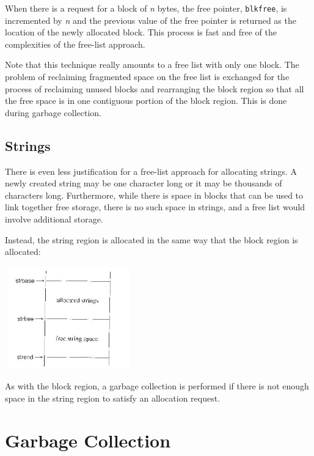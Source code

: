 When there is a request for a block of \textit{n} bytes, the free
pointer, \texttt{blkfree}, is incremented by \textit{n} and the
previous value of the free pointer is returned as the location of the
newly allocated block. This process is fast and free of the
complexities of the free-list approach.


Note that this technique really amounts to a free list with only one
block. The problem of reclaiming fragmented space on the free list is
exchanged for the process of reclaiming unused blocks and rearranging
the block region so that all the free space is in one contiguous
portion of the block region. This is done during garbage collection.

\subsection{Strings}

There is even less justification for a free-list approach for
allocating strings. A newly created string may be one character long
or it may be thousands of characters long. Furthermore, while there is
space in blocks that can be used to link together free storage, there
is no such space in strings, and a free list would involve additional
storage.

Instead, the string region is allocated in the same way that the block
region is allocated:

\begin{center}
\includegraphics[width=2.1799in,height=1.7492in]{ib-img/ib-img089.jpg}
\end{center}

As with the block region, a garbage collection is performed if there
is not enough space in the string region to satisfy an allocation
request.


\section{Garbage Collection}


